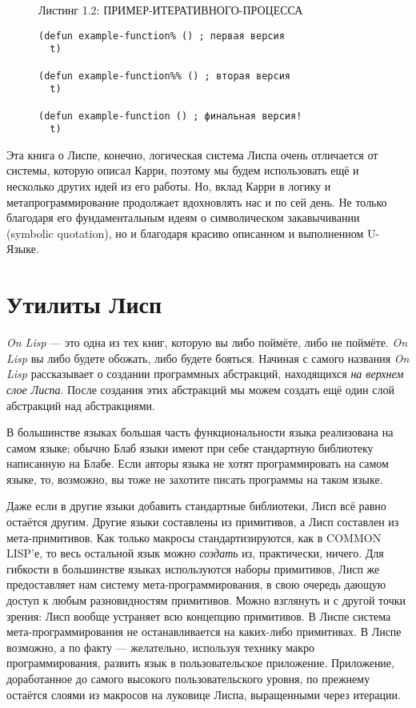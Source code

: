 \begin{figure}Листинг 1.2: ПРИМЕР-ИТЕРАТИВНОГО-ПРОЦЕССА\label{listing_1.2}
\listbegin
\begin{verbatim}
(defun example-function% () ; первая версия
  t)

(defun example-function%% () ; вторая версия
  t)

(defun example-function () ; финальная версия!
  t)
\end{verbatim}
\listend
\end{figure}

Эта книга о Лиспе, конечно, логическая система Лиспа очень отличается от системы, которую описал Карри, поэтому мы будем использовать ещё и несколько других идей из его работы. Но, вклад Карри в логику и метапрограммирование продолжает вдохновлять нас и по сей день. Не только благодаря его фундаментальным идеям о символическом закавычивании (symbolic quotation), но и благодаря красиво описанном и выполненном U-Языке.
\section{Утилиты Лисп}\label{section_the_lisp_utility}

\emph{On Lisp} --- это одна из тех книг, которую вы либо поймёте, либо не поймёте. \emph{On Lisp} вы либо будете обожать, либо будете бояться. Начиная с самого названия \emph{On Lisp} рассказывает о создании программных абстракций, находящихся \emph{на верхнем слое Лиспа}. После создания этих абстракций мы можем создать ещё один слой абстракций над абстракциями.

В большинстве языках большая часть функциональности языка реализована на самом языке; обычно Блаб языки имеют при себе стандартную библиотеку написанную на Блабе. Если авторы языка не хотят программировать на самом языке, то, возможно, вы тоже не захотите писать программы на таком языке.

Даже если в другие языки добавить стандартные библиотеки, Лисп всё равно остаётся другим. Другие языки составлены из примитивов, а Лисп составлен из мета-примитивов. Как только макросы стандартизируются, как в COMMON LISP'е, то весь остальной язык можно \emph{создать} из, практически, ничего. Для гибкости в большинстве языках используются наборы примитивов, Лисп же предоставляет нам систему мета-программирования, в свою очередь дающую доступ к любым разновидностям примитивов. Можно взглянуть и с другой точки зрения: Лисп вообще устраняет всю концепцию примитивов. В Лиспе система мета-программирования не останавливается на каких-либо примитивах. В Лиспе возможно, а по факту --- желательно, используя технику макро программирования, развить язык в пользовательское приложение. Приложение, доработанное до самого высокого пользовательского уровня, по прежнему остаётся слоями из макросов на луковице Лиспа, выращенными через итерации.

